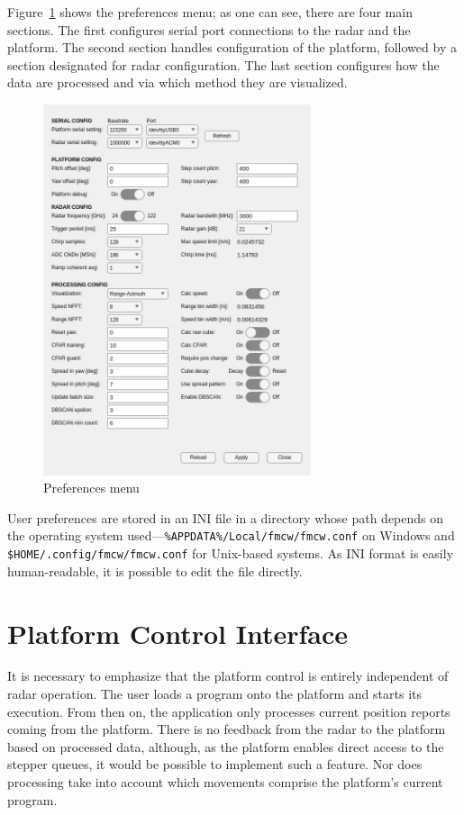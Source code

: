 Figure~\ref{fig:preferences} shows the preferences menu; as one can see, there are four main sections.
The first configures serial port connections to the radar and the platform.
The second section handles configuration of the platform, followed by a section designated for radar configuration.
The last section configures how the data are processed and via which method they are visualized.

\begin{figure}[h!]
  \centering
  \includegraphics[width=0.7\textwidth]{../img/preferences.jpg}
  \caption[Preferences menu]{Preferences menu}
  \label{fig:preferences}
\end{figure}

User preferences are stored in an INI file in a directory whose path depends on the operating system used—\texttt{\%APPDATA\%/Local/fmcw/fmcw.conf} on Windows and \texttt{\$HOME/.config/fmcw/fmcw.conf} for Unix-based systems.
As INI format is easily human-readable, it is possible to edit the file directly.


\section{Platform Control Interface}

It is necessary to emphasize that the platform control is entirely independent of radar operation.
The user loads a program onto the platform and starts its execution.
From then on, the application only processes current position reports coming from the platform.
There is no feedback from the radar to the platform based on processed data, although, as the platform enables direct access to the stepper queues, it would be possible to implement such a feature.
Nor does processing take into account which movements comprise the platform's current program.

